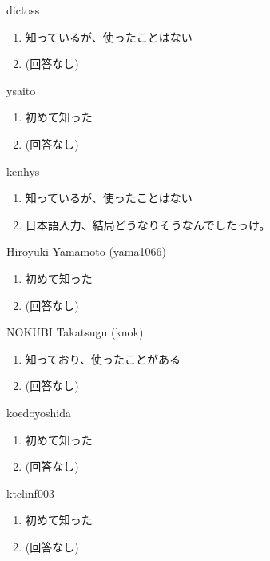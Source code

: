 \begin{prework}{ dictoss }
  \begin{enumerate}
  \item 知っているが、使ったことはない
  \item (回答なし)
  \end{enumerate}
\end{prework}

\begin{prework}{ ysaito }
  \begin{enumerate}
  \item 初めて知った
  \item (回答なし)
  \end{enumerate}
\end{prework}

\begin{prework}{ kenhys }
  \begin{enumerate}
  \item 知っているが、使ったことはない
  \item 日本語入力、結局どうなりそうなんでしたっけ。
  \end{enumerate}
\end{prework}

\begin{prework}{ Hiroyuki Yamamoto (yama1066) }
  \begin{enumerate}
  \item 初めて知った
  \item (回答なし)
  \end{enumerate}
\end{prework}

\begin{prework}{ NOKUBI Takatsugu (knok) }
  \begin{enumerate}
  \item 知っており、使ったことがある
  \item (回答なし)
  \end{enumerate}
\end{prework}

\begin{prework}{ koedoyoshida }
  \begin{enumerate}
  \item 初めて知った
  \item (回答なし)
  \end{enumerate}
\end{prework}

\begin{prework}{ ktclinf003 }
  \begin{enumerate}
  \item 初めて知った
  \item (回答なし)
  \end{enumerate}
\end{prework}

